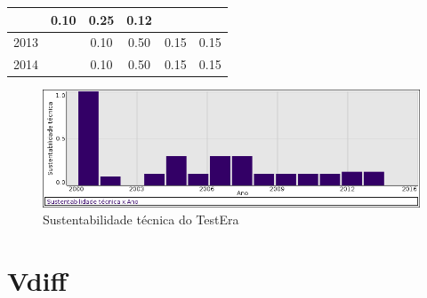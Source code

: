 \begin{table}[H]
\begin{tabular}{| l | c | c | c | c | c |}
          &
          0.10
          &
          0.25
          &
          0.12
          &
          \\
\hline
            2013
          &
          
          &
          0.10
          &
          0.50
          &
          0.15
          &
            {\color{red} 0.15}
          \\
\hline
            2014
          &
          
          &
          0.10
          &
          0.50
          &
          0.15
          &
            {\color{red} 0.15}
          \\
\hline
\end{tabular}
\end{table}

\begin{figure}[h]
  \center
  \includegraphics[scale=0.50]{imagens/softwares-charts/testera.png}
  \caption{Sustentabilidade técnica do TestEra}
\end{figure}


\section{Vdiff}


